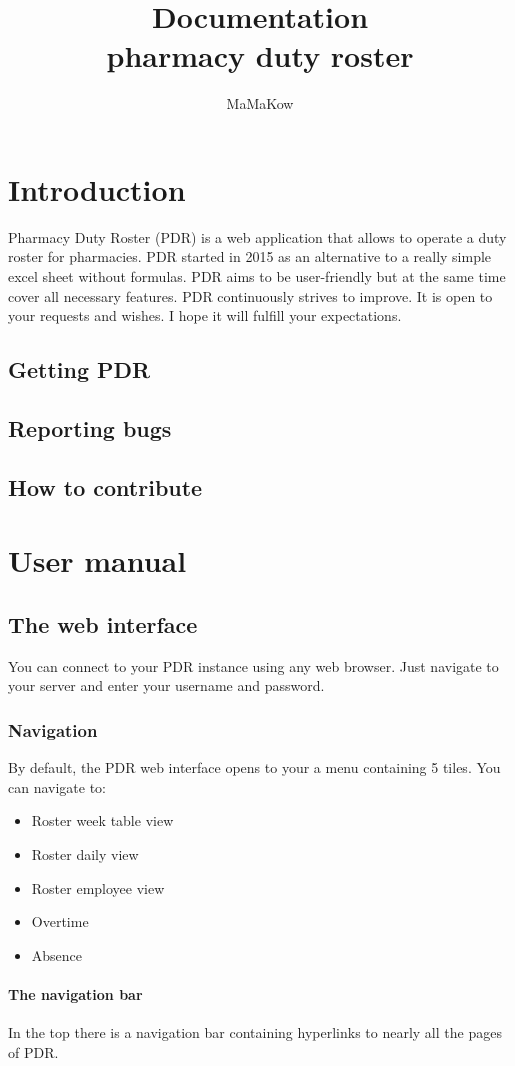 \documentclass[12pt,a4paper,titlepage]{book}
\author{MaMaKow}
\title{Documentation \\pharmacy duty roster}
\begin{document}
\maketitle
\tableofcontents


\chapter{Introduction}
Pharmacy Duty Roster (PDR) is a web application that allows to operate a duty roster for pharmacies.
PDR started in 2015 as an alternative to a really simple excel sheet without formulas.
PDR aims to be user-friendly but at the same time cover all necessary features.
PDR continuously strives to improve. It is open to your requests and wishes.
I hope it will fulfill your expectations.
\section{Getting PDR}
\section{Reporting bugs}
\section{How to contribute}


\chapter{User manual}
\section{The web interface}
You can connect to your PDR instance using any web browser. Just navigate to your server and enter your username and password.
\subsection{Navigation}
By default, the PDR web interface opens to your a menu containing 5 tiles.
You can navigate to:
\begin{itemize}
\item Roster week table view
\item Roster daily view
\item Roster employee view
\item Overtime 
\item Absence
\end{itemize}
\subsubsection{The navigation bar}
In the top there is a navigation bar containing hyperlinks to nearly all the pages of PDR.
\end{document}
